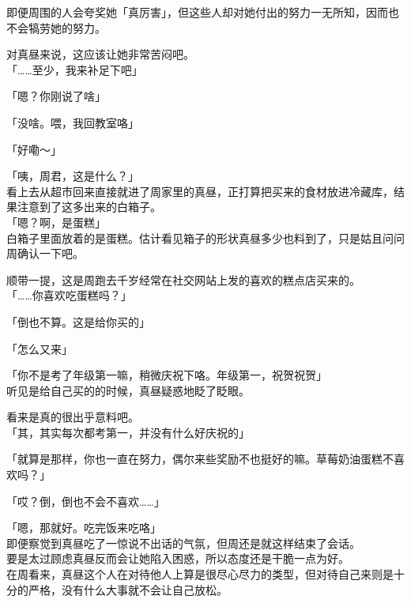 即便周围的人会夸奖她「真厉害」，但这些人却对她付出的努力一无所知，因而也不会犒劳她的努力。

对真昼来说，这应该让她非常苦闷吧。\\

「……至少，我来补足下吧」

「嗯？你刚说了啥」

「没啥。喂，我回教室咯」

「好嘞～」\\

\vspace{2\baselineskip}

「咦，周君，这是什么？」\\

看上去从超市回来直接就进了周家里的真昼，正打算把买来的食材放进冷藏库，结果注意到了这多出来的白箱子。\\

「嗯？啊，是蛋糕」\\

白箱子里面放着的是蛋糕。估计看见箱子的形状真昼多少也料到了，只是姑且问问周确认一下吧。

顺带一提，这是周跑去千岁经常在社交网站上发的喜欢的糕点店买来的。\\

「……你喜欢吃蛋糕吗？」

「倒也不算。这是给你买的」

「怎么又来」

「你不是考了年级第一嘛，稍微庆祝下咯。年级第一，祝贺祝贺」\\

听见是给自己买的的时候，真昼疑惑地眨了眨眼。

看来是真的很出乎意料吧。\\

「其，其实每次都考第一，并没有什么好庆祝的」

「就算是那样，你也一直在努力，偶尔来些奖励不也挺好的嘛。草莓奶油蛋糕不喜欢吗？」

「哎？倒，倒也不会不喜欢……」

「嗯，那就好。吃完饭来吃咯」\\

即便察觉到真昼吃了一惊说不出话的气氛，但周还是就这样结束了会话。\\

要是太过顾虑真昼反而会让她陷入困惑，所以态度还是干脆一点为好。\\

在周看来，真昼这个人在对待他人上算是很尽心尽力的类型，但对待自己来则是十分的严格，没有什么大事就不会让自己放松。

